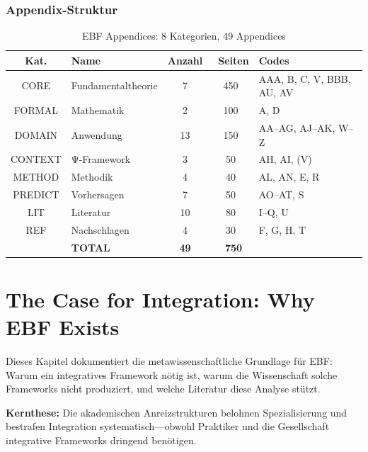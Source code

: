 \documentclass[12pt,a4paper]{article}
\begin{document}
\section{Appendix-Struktur}

\begin{table}[htbp]
\centering
\caption{EBF Appendices: 8 Kategorien, 49 Appendices}
\renewcommand{\arraystretch}{1.2}
\small
\begin{tabular}{@{}clccl@{}}
\toprule
\textbf{Kat.} & \textbf{Name} & \textbf{Anzahl} & \textbf{~Seiten} & \textbf{Codes} \\
\midrule
\cellcolor{bcmred!20}CORE & Fundamentaltheorie & 7 & 450 & AAA, B, C, V, BBB, AU, AV \\
FORMAL & Mathematik & 2 & 100 & A, D \\
DOMAIN & Anwendung & 13 & 150 & AA--AG, AJ--AK, W--Z \\
CONTEXT & Ψ-Framework & 3 & 50 & AH, AI, (V) \\
METHOD & Methodik & 4 & 40 & AL, AN, E, R \\
PREDICT & Vorhersagen & 7 & 50 & AO--AT, S \\
LIT & Literatur & 10 & 80 & I--Q, U \\
REF & Nachschlagen & 4 & 30 & F, G, H, T \\
\midrule
& \textbf{TOTAL} & \textbf{49} & \textbf{~750} & \\
\bottomrule
\end{tabular}
\end{table}


%
%

\part{The Case for Integration: Why EBF Exists}

\begin{tcolorbox}[colback=bcmred!10!white, colframe=bcmred,
    title=\textbf{Warum gibt es keine Meta-Frameworks in der Wissenschaft?}]

Dieses Kapitel dokumentiert die metawissenschaftliche Grundlage für EBF:
Warum ein integratives Framework nötig ist, warum die Wissenschaft solche
Frameworks nicht produziert, und welche Literatur diese Analyse stützt.

\textbf{Kernthese:} Die akademischen Anreizstrukturen belohnen Spezialisierung
und bestrafen Integration systematisch---obwohl Praktiker und die Gesellschaft
integrative Frameworks dringend benötigen.

\end{tcolorbox}
\end{document}
